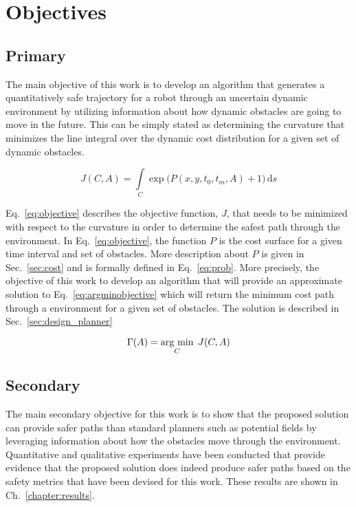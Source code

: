 


\chapter{Objectives}

\label{chapter:objectives}

\section{Primary}

The main objective of this work is to develop an algorithm that generates a
quantitatively safe trajectory for a robot through an uncertain dynamic
environment by utilizing information about how dynamic obstacles are going to
move in the future. This can be simply stated as determining the curvature that
minimizes the line integral over the dynamic cost distribution for a given set
of dynamic obstacles.

\begin{equation}
    J(C, A) = \int \limits_{C} \exp{\Big(P(x, y, t_0, t_m, A) + 1\Big)} \,
    \mathrm{d}s
    \label{eq:objective}
\end{equation}

Eq.~\ref{eq:objective} describes the objective function, $J$, that needs to be
minimized with respect to the curvature in order to determine the safest path
through the environment. In Eq.~\ref{eq:objective}, the function $P$ is the
cost surface for a given time interval and set of obstacles. More description
about $P$ is given in Sec.~\ref{sec:cost} and is formally defined in
Eq.~\ref{eq:prob}. More precisely, the objective of this work to develop an
algorithm that will provide an approximate solution to
Eq.~\ref{eq:argminobjective} which will return the minimum cost path through a
environment for a given set of obstacles. The solution is described in
Sec.~\ref{sec:design_planner}

\begin{equation}
    \Gamma(A) = \underset{C}{\operatorname{arg}\,\operatorname{min}}\; \, J(C, A)
    \label{eq:argminobjective}
\end{equation}


\section{Secondary}

The main secondary objective for this work is to show that the proposed
solution can provide safer paths than standard planners such as potential
fields by leveraging information about how the obstacles move through the
environment. Quantitative and qualitative experiments have been conducted that
provide evidence that the proposed solution does indeed produce safer paths
based on the safety metrics that have been devised for this work. These results
are shown in Ch.~\ref{chapter:results}.



